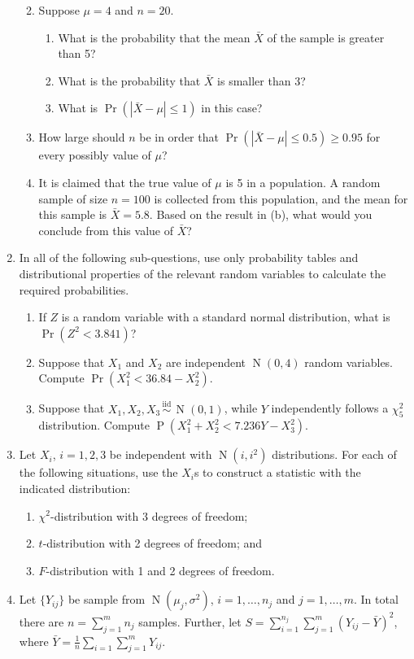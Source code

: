 \documentclass[
]{book}
\DeclareMathOperator{\Prob}{P}
\DeclareMathOperator{\N}{N}
\newcommand{\iid}{\,\overset{\text{iid}}{\sim}\,}
\theoremstyle{definition}
\theoremstyle{definition}
\theoremstyle{definition}
\theoremstyle{definition}
\theoremstyle{remark}
\begin{document}
\begin{enumerate}
  \begin{enumerate}
  \def\labelenumii{(\alph{enumii})}
  \item
    Suppose \(\mu=4\) and \(n=20\).

    \begin{enumerate}
    \def\labelenumiii{\roman{enumiii}.}
    \item
      What is the probability that the mean \(\bar X\) of the sample is greater than 5?
    \item
      What is the probability that \(\bar X\) is smaller than 3?
    \item
      What is \(\Pr(|\bar X - \mu| \leq 1)\) in this case?
    \end{enumerate}
  \item
    How large should \(n\) be in order that \(\Pr(|\bar X - \mu| \leq 0.5) \geq 0.95\) for every possibly value of \(\mu\)?
  \item
    It is claimed that the true value of \(\mu\) is 5 in a population. A random sample of size \(n=100\) is collected from this population, and the mean for this sample is \(\bar X=5.8\). Based on the result in (b), what would you conclude from this value of \(\bar X\)?
  \end{enumerate}
\item
  In all of the following sub-questions, use only probability tables and distributional properties of the relevant random variables to calculate the required probabilities.

  \begin{enumerate}
  \def\labelenumii{(\alph{enumii})}
  \item
    If \(Z\) is a random variable with a standard normal distribution, what is \(\Pr(Z^2 < 3.841)\)?
  \item
    Suppose that \(X_1\) and \(X_2\) are independent \(\N(0,4)\) random variables. Compute \(\Pr(X_1^2 < 36.84 - X_2^2)\).
  \item
    Suppose that \(X_1,X_2,X_3\iid\N(0,1)\), while \(Y\) independently follows a \(\chi^2_5\) distribution. Compute \(\Prob(X_1^2+X_2^2 < 7.236Y - X_3^2)\).
  \end{enumerate}
\item
  Let \(X_i\), \(i=1,2,3\) be independent with \(\N(i,i^2)\) distributions.
  For each of the following situations, use the \(X_i\)s to construct a statistic with the indicated distribution:

  \begin{enumerate}
  \def\labelenumii{(\alph{enumii})}
  \item
    \(\chi^2\)-distribution with 3 degrees of freedom;
  \item
    \(t\)-distribution with 2 degrees of freedom; and
  \item
    \(F\)-distribution with 1 and 2 degrees of freedom.
  \end{enumerate}
\item
  Let \(\{Y_{ij}\}\) be sample from \(\N(\mu_j,\sigma^2)\), \(i=1,\dots,n_j\) and \(j=1,\dots,m\). In total there are \(n=\sum_{j=1}^m n_j\) samples. Further, let \(S = \sum_{i=1}^{n_j}\sum_{j=1}^m (Y_{ij} - \bar Y)^2\), where \(\bar Y = \frac{1}{n}\sum_{i=1}\sum_{j=1}^m Y_{ij}\).


\end{enumerate}
\end{document}
